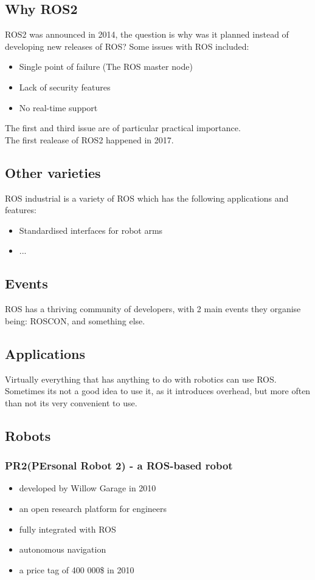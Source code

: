 \subsection{Why ROS2}
ROS2 was announced in 2014, the question is why was it planned instead of developing new releases of ROS?
Some issues with ROS included:
\begin{itemize}
        \item Single point of failure (The ROS master node)
        \item Lack of security features
        \item No real-time support        
\end{itemize}
The first and third issue are of particular practical importance.
\\ The first realease of ROS2 happened in 2017.
\subsection{Other varieties}
ROS industrial is a variety of ROS which has the following applications and features:
\begin{itemize}
        \item Standardised interfaces for robot arms
        \item ...
\end{itemize}

\subsection{Events}
ROS has a thriving community of developers, with 2 main events they organise being: ROSCON, and something else.

\subsection{Applications}
Virtually everything that has anything to do with robotics can use ROS. Sometimes its not a good idea to use it, as it introduces overhead, but more often than not its very convenient to use.
\subsection{Robots}
\subsubsection{PR2(PErsonal Robot 2) - a ROS-based robot}
\begin{itemize}
        \item developed by Willow Garage in 2010
        \item an open research platform for engineers
        \item fully integrated with ROS
        \item autonomous navigation
        \item a price tag of 400 000\$ in 2010
        
\end{itemize}    
